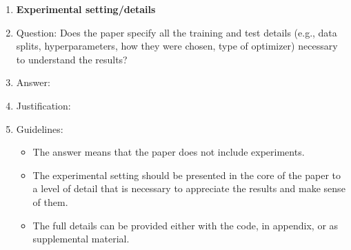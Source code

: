 \documentclass{article}
\begin{document}
\begin{enumerate}
\item {\bf Experimental setting/details}
    \item[] Question: Does the paper specify all the training and test details (e.g., data splits, hyperparameters, how they were chosen, type of optimizer) necessary to understand the results?
    \item[] Answer: \answerTODO{} %
    \item[] Justification: \justificationTODO{}
    \item[] Guidelines:
    \begin{itemize}
        \item The answer \answerNA{} means that the paper does not include experiments.
        \item The experimental setting should be presented in the core of the paper to a level of detail that is necessary to appreciate the results and make sense of them.
        \item The full details can be provided either with the code, in appendix, or as supplemental material.
    \end{itemize}


\end{enumerate}
\end{document}

